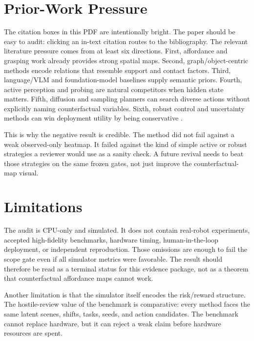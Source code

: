\documentclass{article}
\begin{document}
\section{Prior-Work Pressure}
The citation boxes in this PDF are intentionally bright. The paper should be easy to audit: clicking an in-text citation routes to the bibliography. The relevant literature pressure comes from at least six directions. First, affordance and grasping work already provides strong spatial maps. Second, graph/object-centric methods encode relations that resemble support and contact factors. Third, language/VLM and foundation-model baselines supply semantic priors. Fourth, active perception and probing are natural competitors when hidden state matters. Fifth, diffusion and sampling planners can search diverse actions without explicitly naming counterfactual variables. Sixth, robust control and uncertainty methods can win deployment utility by being conservative \citep{r1048550arxiv230705973,r101080146893672011627836,r101002rob20170,r101080146893672011554383,r101109mrs20198901093,r103390s24248187,r101109robot20041307181,r101002rob20273,r101002rob20173,onmultirobotmapfusionbyinterrobotobservati,r101109roman20188525627,r101002rob20234}.

This is why the negative result is credible. The method did not fail against a weak observed-only heatmap. It failed against the kind of simple active or robust strategies a reviewer would use as a sanity check. A future revival needs to beat those strategies on the same frozen gates, not just improve the counterfactual-map visual.

\section{Limitations}
The audit is CPU-only and simulated. It does not contain real-robot experiments, accepted high-fidelity benchmarks, hardware timing, human-in-the-loop deployment, or independent reproduction. Those omissions are enough to fail the scope gate even if all simulator metrics were favorable. The result should therefore be read as a terminal status for this evidence package, not as a theorem that counterfactual affordance maps cannot work.

Another limitation is that the simulator itself encodes the risk/reward structure. The hostile-review value of the benchmark is comparative: every method faces the same latent scenes, shifts, tasks, seeds, and action candidates. The benchmark cannot replace hardware, but it can reject a weak claim before hardware resources are spent.
\end{document}

